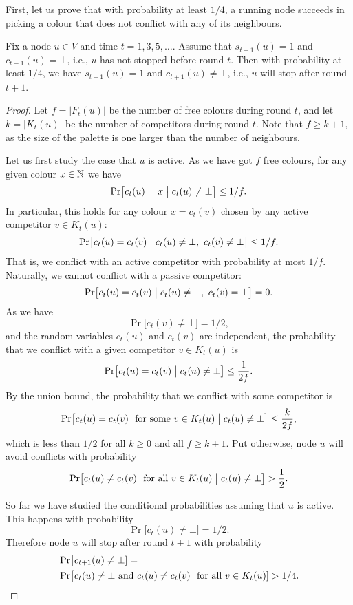 First, let us prove that with probability at least $1/4$, a running node succeeds in picking a colour that does not conflict with any of its neighbours.
\begin{lemma}\label{lem:bdrand-onestep}
    Fix a node $u \in V$ and time $t = 1,3,5,\dotsc$. Assume that $s_{t-1}(u) = 1$ and $c_{t-1}(u) = \bot$, i.e., $u$ has not stopped before round $t$. Then with probability at least $1/4$, we have $s_{t+1}(u) = 1$ and $c_{t+1}(u) \ne \bot$, i.e., $u$ will stop after round $t+1$.
\end{lemma}
\begin{proof}
    Let $f = |F_t(u)|$ be the number of free colours during round $t$, and let $k = |K_t(u)|$ be the number of competitors during round $t$. Note that $f \ge k + 1$, as the size of the palette is one larger than the number of neighbours.

    Let us first study the case that $u$ is active. As we have got $f$ free colours, for any given colour $x \in \mathbb{N}$ we have
    \[
        \Pr\bigl[ c_t(u) = x \bigm| c_t(u) \ne \bot \bigr] \le 1/f.
    \]
    In particular, this holds for any colour $x = c_t(v)$ chosen by any active competitor $v \in K_t(u)$:
    \[
        \Pr\bigl[ c_t(u) = c_t(v) \bigm| c_t(u) \ne \bot,\  c_t(v) \ne \bot \bigr] \le 1/f.
    \]
    That is, we conflict with an active competitor with probability at most $1/f$. Naturally, we cannot conflict with a passive competitor:
    \[
        \Pr\bigl[ c_t(u) = c_t(v) \bigm| c_t(u) \ne \bot,\  c_t(v) = \bot \bigr] = 0.
    \]
    As we have
    \[
        \Pr\bigl[ c_t(v) \ne \bot \bigr] = 1/2,
    \]
    and the random variables $c_t(u)$ and $c_t(v)$ are independent, the probability that we conflict with a given competitor $v \in K_t(u)$ is
    \[
        \Pr\bigl[ c_t(u) = c_t(v) \bigm| c_t(u) \ne \bot \bigr] \le \frac{1}{2f}.
    \]
    By the union bound, the probability that we conflict with some competitor is
    \[
        \Pr\bigl[ c_t(u) = c_t(v) \text{ for some $v \in K_t(u)$} \bigm| c_t(u) \ne \bot \bigr] \le \frac{k}{2f},
    \]
    which is less than $1/2$ for all $k \ge 0$ and all $f \ge k+1$. Put otherwise, node $u$ will avoid conflicts with probability
    \[
        \Pr\bigl[ c_t(u) \ne c_t(v) \text{ for all $v \in K_t(u)$} \bigm| c_t(u) \ne \bot \bigr] > \frac{1}{2}.
    \]

    So far we have studied the conditional probabilities assuming that $u$ is active. This happens with probability
    \[
        \Pr\bigl[ c_t(u) \ne \bot \bigr] = 1/2.
    \]
    Therefore node $u$ will stop after round $t+1$ with probability
    \[
    \begin{split}
        &\Pr\bigl[ c_{t+1}(u) \ne \bot] = \\
        &\Pr\bigl[ c_t(u) \ne \bot \text { and } c_t(u) \ne c_t(v) \text{ for all $v \in K_t(u)$} ] > 1/4.
        \qedhere
    \end{split}
    \]
\end{proof}

